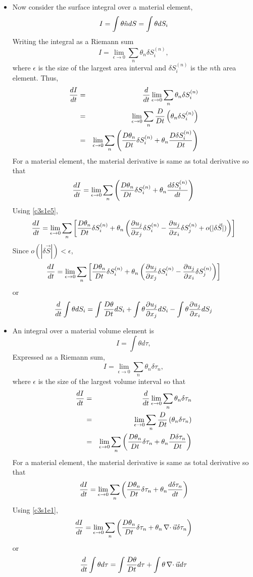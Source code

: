 \begin{itemize}
\item Now consider the surface integral over a material element,
\[
I = \int \theta \hat{n} dS = \int \theta dS_i
\]
Writing the integral as a Riemann sum
\[
I = \lim_{\epsilon \rightarrow 0} \sum_n \theta_n \delta S_i^{(n)},
\]
where $\epsilon$ is the size of the largest area interval and $\delta S_i^{(n)}$ is the $n$th area element. Thus,
\begin{eqnarray*}
\frac{d{I}}{d{t}} &=& \frac{d}{dt}\lim_{\epsilon \rightarrow 0} \sum_n \theta_n \delta S_i^{(n)} \\
 &=& \lim_{\epsilon \rightarrow 0} \sum_n \frac{D}{Dt}\left(\theta_n \delta S_i^{(n)}\right) \\
 &=& \lim_{\epsilon \rightarrow 0} \sum_n \left(\frac{D{\theta_n}}{Dt}\delta S_i^{(n)} + \theta_n \frac{D{\delta S_i^{(n)}}}{Dt}\right)
\end{eqnarray*}
For a material element, the material derivative is same as total derivative so that
\[
\frac{d{I}}{d{t}} = \lim_{\epsilon \rightarrow 0} \sum_n \left(\frac{D{\theta_n}}{Dt}\delta S_i^{(n)} + \theta_n \frac{d{\delta S_i^{(n)}}}{d{t}}\right)
\]
Using \eqref{c3s1e5},
\[
\frac{d{I}}{d{t}} = 
\lim_{\epsilon \rightarrow 0} \sum_n \left[\frac{D{\theta_n}}{Dt}\delta S_i^{(n)} + \theta_n\left(\frac{\partial{u_j}}{\partial{x_j}}\delta S_i^{(n)} - \frac{\partial{u_j}}{\partial{x_i}}\delta S_j^{(n)} + o(|\delta\vec{S}|)\right)\right]
\]
Since $o(|\delta\vec{S}|) < \epsilon$,
\[
\frac{d{I}}{d{t}} = \lim_{\epsilon \rightarrow 0} \sum_n \left[\frac{D{\theta_n}}{Dt}\delta S_i^{(n)} + \theta_n\left(\frac{\partial{u_j}}{\partial{x_j}}\delta S_i^{(n)} - \frac{\partial{u_j}}{\partial{x_i}}\delta S_j^{(n)}\right)\right]
\]
or
\begin{equation}\label{c3s1e9}
\frac{d}{dt}\int \theta dS_i = \int\frac{D{\theta}}{Dt}dS_i + \int\theta\frac{\partial{u_j}}{\partial{x_j}}dS_i - \int\theta\frac{\partial{u_j}}{\partial{x_i}}dS_j
\end{equation}

\item An integral over a material volume element is
\[
I = \int\theta d\tau,
\]
Expressed as a Riemann sum,
\[
I = \lim_{\epsilon \rightarrow 0}\sum_n \theta_n \delta \tau_n,
\]
where $\epsilon$ is the size of the largest volume interval so that
\begin{eqnarray*}
\frac{d{I}}{d{t}} &=& \frac{d}{dt}\lim_{\epsilon \rightarrow 0}\sum_n \theta_n \delta \tau_n \\
 &=& \lim_{\epsilon \rightarrow 0}\sum_n \frac{D}{Dt}\left(\theta_n \delta \tau_n\right) \\
 &=& \lim_{\epsilon \rightarrow 0}\sum_n \left(\frac{D{\theta_n}}{Dt} \delta \tau_n + \theta_n\frac{D{\delta \tau_n}}{Dt}\right)
\end{eqnarray*}
For a material element, the material derivative is same as total derivative so that
\[
\frac{d{I}}{d{t}} = \lim_{\epsilon \rightarrow 0}\sum_n \left(\frac{D{\theta_n}}{Dt} \delta \tau_n + \theta_n\frac{d{\delta \tau_n}}{d{t}}\right)
\]
Using \eqref{c3s1e1},
\[
\frac{d{I}}{d{t}} = \lim_{\epsilon \rightarrow 0}\sum_n \left(\frac{D{\theta_n}}{Dt} \delta \tau_n + \theta_n\operatorname{\nabla\cdot}\vec{u}\delta \tau_n\right)
\]
or
\begin{equation}\label{c3s1e10}
\frac{d}{dt}\int\theta d\tau = \int\frac{D{\theta}}{Dt} d\tau + \int\theta\operatorname{\nabla\cdot}\vec{u} d\tau
\end{equation}


\end{itemize}
